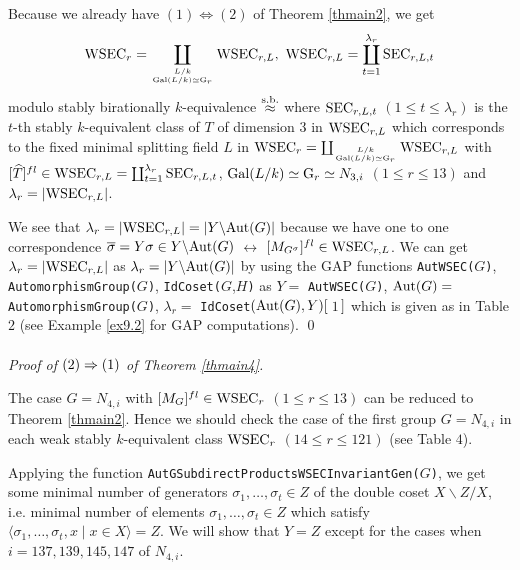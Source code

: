 \documentclass{amsart}
\theoremstyle{plain}
\theoremstyle{definition}
\theoremstyle{remark}
\begin{document}
Because we already have $(1)\Leftrightarrow (2)$ of {Theorem \ref{thmain2}}, 
we get 
\begin{align*}
{\rm WSEC}_r=\coprod_{L/k\atop {\rm Gal}(L/k)\simeq {\rm G}_r}
{\rm WSEC}_{r,L},\ 
{\rm WSEC}_{r,L}=
\coprod_{t=1}^{\lambda_{r}} {\rm SEC}_{r,L,t}
\end{align*}
modulo stably birationally $k$-equivalence $\stackrel{\rm s.b.}{\approx}$ 
where 
${\rm SEC}_{r,L,t}$ $(1\leq t\leq \lambda_{r})$ is the $t$-th 
stably $k$-equivalent class of $T$ of dimension $3$ in 
${\rm WSEC}_{r,L}$ which corresponds to the fixed minimal splitting field $L$ 
in 
${\rm WSEC}_r=\coprod_{L/k\atop {\rm Gal}(L/k)\simeq {\rm G}_r} {\rm WSEC}_{r,L}$ 
with 
$[\widehat{T}]^{fl}\in {\rm WSEC}_{r,L}
=\coprod_{t=1}^{\lambda_r} {\rm SEC}_{r,L,t}$, 
${\rm Gal}(L/k)\simeq {\rm G}_r\simeq N_{3,i}$ 
$(1\leq r\leq 13)$ and 
$\lambda_r=|{\rm WSEC}_{r,L}|$. 

We see that $\lambda_r=|{\rm WSEC}_{r,L}|=|Y\backslash {\rm Aut}(G)|$ 
because we have one to one correspondence 
$\overline{\sigma}=Y \sigma\in Y\backslash {\rm Aut}(G)$ $\leftrightarrow$ 
$[M_{G^\sigma}]^{fl}\in{\rm WSEC}_{r,L}$. 
%
We can get $\lambda_r=|{\rm WSEC}_{r,L}|$ as 
$\lambda_r=|Y\backslash {\rm Aut}(G)|$ 
by using the GAP functions {\tt AutWSEC(}$G${\tt )}, 
{\tt AutomorphismGroup(}$G${\tt )}, {\tt IdCoset(}$G$,$H${\tt )} as 
$Y=$ {\tt AutWSEC(}$G${\tt )}, 
${\rm Aut}(G)=$ {\tt AutomorphismGroup(}$G${\tt )}, 
$\lambda_r=$ {\tt IdCoset}$({\rm Aut}(G),Y){\tt [}$\,$1$\,${\tt ]}$ 
which is given as in Table $2$ (see Example \ref{ex9.2} for GAP computations). 
\qed\\

~\\
{\it Proof of ${\rm (2)}\Rightarrow {\rm (1)}$ of {Theorem \ref{thmain4}}.}

%
The case $G=N_{4,i}$ with $[M_G]^{fl}\in {\rm WSEC}_r$ $(1\leq r\leq 13)$ 
can be reduced to Theorem \ref{thmain2}. 
Hence we should check the case of the first group $G=N_{4,i}$ 
in each weak stably $k$-equivalent class 
${\rm WSEC}_r$ $(14\leq r\leq 121)$ (see Table $4$). 

Applying the function 
{\tt AutGSubdirectProductsWSECInvariantGen(}$G${\tt)}, 
we get some minimal number of generators 
$\sigma_1,\ldots,\sigma_t\in Z$ of the double coset $X\backslash Z/X$, i.e. 
minimal number of elements $\sigma_1,\ldots,\sigma_t\in Z$ which satisfy 
$\langle \sigma_1,\ldots,\sigma_t,x\mid x\in X\rangle=Z$. 
We will show that $Y=Z$ except for the cases 
when $i=137,139,145,147$ of $N_{4,i}$. \\
\end{document}
